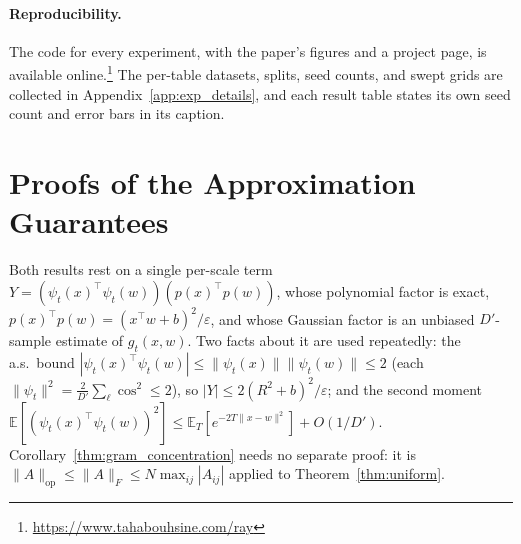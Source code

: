 \documentclass{article}
\begin{document}
\paragraph{Reproducibility.} The code for every experiment, with the paper's figures and a project page, is available online.\footnote{\url{https://www.tahabouhsine.com/ray}} The per-table datasets, splits, seed counts, and swept grids are collected in Appendix~\ref{app:exp_details}, and each result table states its own seed count and error bars in its caption.




\appendix

\section{Proofs of the Approximation Guarantees}
\label{app:proofs}

Both results rest on a single per-scale term $Y=(\psi_t(x)^\top\psi_t(w))(p(x)^\top p(w))$, whose polynomial factor is exact, $p(x)^\top p(w)=(x^\top w+b)^2/\varepsilon$, and whose Gaussian factor is an unbiased $D'$-sample estimate of $g_t(x,w)$. Two facts about it are used repeatedly: the a.s.\ bound $|\psi_t(x)^\top\psi_t(w)|\le\|\psi_t(x)\|\|\psi_t(w)\|\le2$ (each $\|\psi_t\|^2=\tfrac2{D'}\sum_\ell\cos^2\le2$), so $|Y|\le 2(R^2+b)^2/\varepsilon$; and the second moment $\mathbb{E}[(\psi_t(x)^\top\psi_t(w))^2]\le\mathbb{E}_T[e^{-2T\|x-w\|^2}]+O(1/D')$. Corollary~\ref{thm:gram_concentration} needs no separate proof: it is $\|A\|_{\mathrm{op}}\le\|A\|_F\le N\max_{ij}|A_{ij}|$ applied to Theorem~\ref{thm:uniform}.
\end{document}
